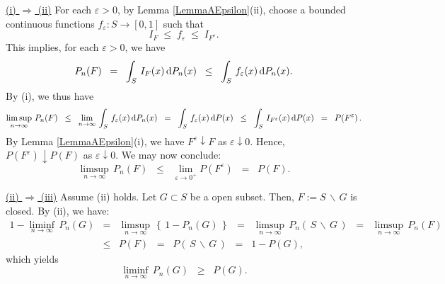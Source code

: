 \proof
\vskip 0.3cm
\noindent
\underline{(i) $\Longrightarrow$ (ii)}
\vskip 0.2cm
\noindent
For each $\varepsilon > 0$, by Lemma \ref{LemmaAEpsilon}(ii), choose
a bounded continuous functions $f_{\varepsilon} : S \longrightarrow [0,1]$ such that
\begin{equation*}
I_{F} \; \leq \; f_{\varepsilon} \; \leq \; I_{F^{\varepsilon}}.
\end{equation*}
This implies, for each $\varepsilon > 0$, we have
\begin{equation*}
P_{n}(F)
\;\; = \;\; \int_{S}\,I_{F}(x)\,\textnormal{d} P_{n}(x)
\;\; \leq \;\; \int_{S}\,f_{\varepsilon}(x)\,\textnormal{d} P_{n}(x).
\end{equation*}
By (i), we thus have
\begin{equation*}
\limsup_{n\rightarrow\infty}\,P_{n}(F)
\;\;\leq\;\; \lim_{n\rightarrow\infty}\,\int_{S}\,f_{\varepsilon}(x)\,\textnormal{d} P_{n}(x)
\;\;=\;\; \int_{S}\,f_{\varepsilon}(x)\,\textnormal{d} P(x)
\;\;\leq\;\; \int_{S}\,I_{F^{\varepsilon}}(x)\,\textnormal{d} P(x)
\;\;=\;\; P\!\left(F^{\varepsilon}\right).
\end{equation*}
By Lemma \ref{LemmaAEpsilon}(i), we have $F^{\varepsilon}\downarrow F$ as $\varepsilon\downarrow 0$.
Hence, $P\!\left(F^{\varepsilon}\right)\downarrow P(F)$ as $\varepsilon\downarrow 0$.
We may now conclude:
\begin{equation*}
\limsup_{n\rightarrow\infty}\,P_{n}(F)
\;\;\leq\;\; \lim_{\varepsilon\rightarrow 0^{+}}P\!\left(F^{\varepsilon}\right)
\;\;=\;\; P\!\left(F\right).
\end{equation*}

\vskip 0.3cm
\noindent
\underline{(ii) $\Longrightarrow$ (iii)}
\vskip 0.2cm
\noindent
Assume (ii) holds. Let $G \subset S$ be a open subset.
Then, $F := S\,\backslash\,G$ is closed. By (ii), we have:
\begin{eqnarray*}
1 - \liminf_{n\rightarrow\infty}\,P_{n}\!\left(G\right)
&=& \limsup_{n\rightarrow\infty}\,\left\{\,1 - P_{n}\!\left(G\right)\,\right\}
\;\;=\;\;\limsup_{n\rightarrow\infty}\,P_{n}\!\left(\,S\,\backslash\,G\,\right)
\;\;=\;\;\limsup_{n\rightarrow\infty}\,P_{n}(F)
\\
&\leq& P\!\left(F\right)
\;\;=\;\; P\!\left(\,S\,\backslash\,G\,\right)
\;\;=\;\; 1 - P\!\left(G\right),
\end{eqnarray*}
which yields
\begin{equation}
\liminf_{n\rightarrow\infty}\,P_{n}\!\left(G\right)
\;\;\geq\;\; P\!\left(G\right).
\end{equation}

